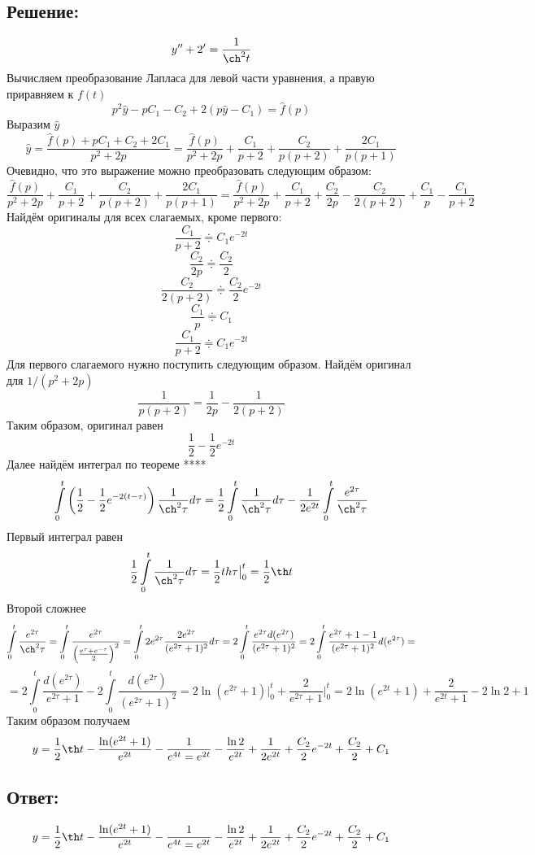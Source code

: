 \documentclass{article}
\begin{document}
	\subsection{Решение:}
	\[y'' + 2' = \frac{1}{\ch^2t}\]
	Вычисляем преобразование Лапласа для левой части уравнения, а правую приравняем к $f(t)$
	\[p^2\hat{y}-pC_1-C_2 + 2(p\hat{y} - C_1) = \hat{f}(p)\]
	Выразим $\hat{y}$
	\[\hat{y} = \frac{\hat{f}(p) + pC_1+C_2+2C_1}{p^2+2p} = \frac{\hat{f}(p)}{p^2+2p} +\frac{C_1}{p+2}+\frac{C_2}{p(p+2)}+\frac{2C_1}{p(p+1)}\]
	Очевидно, что это выражение можно преобразовать следующим образом:
	\[\frac{\hat{f}(p)}{p^2+2p} +\frac{C_1}{p+2}+\frac{C_2}{p(p+2)}+\frac{2C_1}{p(p+1)} = \frac{\hat{f}(p)}{p^2+2p} +\frac{C_1}{p+2}+\frac{C_2}{2p}-\frac{C_2}{2(p+2)}+\frac{C_1}{p} - \frac{C_1}{p+2}\]
	Найдём оригиналы для всех слагаемых, кроме первого:
	\[\frac{C_1}{p+2} \doteqdot  C_1e^{-2t}\]
	\[\frac{C_2}{2p}\doteqdot\frac{C_2}{2}\]
	\[\frac{C_2}{2(p+2)} \doteqdot \frac{C_2}{2}e^{-2t}\]
	\[\frac{C_1}{p} \doteqdot C_1\]
	\[\frac{C_1}{p+2} \doteqdot C_1e^{-2t}\]
	Для первого слагаемого нужно поступить следующим образом.\newline
	Найдём оригинал для $1/(p^2+2p)$
	\[\frac{1}{p(p+2)} = \frac{1}{2p} - \frac{1}{2(p+2)}\]
	Таким образом, оригинал равен
	\[\frac{1}{2} - \frac{1}{2}e^{-2t}\]
	Далее найдём интеграл по теореме ****
	\[\int\limits_{0}^t \left(\frac{1}{2} -\frac{1}{2}e^{-2(t-\tau)}\right)\frac{1}{\ch^2\tau}d\tau=\frac{1}{2}\int\limits_{0}^t \frac{1}{\ch^2\tau}d\tau - \frac{1}{2e^{2t}}\int\limits_{0}^t \frac{e^{2\tau}}{\ch^2\tau}\]
	Первый интеграл равен
	\[\frac{1}{2}\int\limits_{0}^t \frac{1}{\ch^2\tau}d\tau = \frac{1}{2}th\tau\big|_0^t = \frac{1}{2}\th t\]
	Второй сложнее
	\[\int\limits_{0}^t \frac{e^{2\tau}}{\ch^2\tau} = \int\limits_{0}^t \frac{e^{2\tau}}{\left(\frac{e^\tau + e^{-\tau}}{2}\right)^2}=\int\limits_{0}^t 2e^{2\tau} \frac{2e^{2\tau}}{(e^{2\tau}+1)^2}d\tau = 2\int\limits_{0}^t\frac{e^{2\tau}d(e^{2\tau})}{(e^{2\tau} + 1)^2} = 2\int\limits_{0}^t\frac{e^{2\tau}+1-1}{(e^{2\tau} + 1)^2}d(e^{2\tau}) =\]
	\[=2\int\limits_{0}^t\frac{d(e^{2\tau})}{e^{2\tau} + 1} - 2 \int\limits_{0}^t\frac{d(e^{2\tau})}{(e^{2\tau} + 1)^2} = 2 \ln {(e^{2\tau} + 1)} \big|_0^t + \frac{2}{e^{2\tau} +1} \big|_0^t =  2\ln(e^{2t} + 1) + \frac{2}{e^{2t} +1} - 2\ln2 +1 \]
	Таким образом получаем 
	\[y = \frac{1}{2}\th t -\frac{\ln(e^{2t} + 1)}{e^{2t}} - \frac{1}{e^{4t} = e^{2t}} - \frac{\ln2}{e^{2t}} + \frac{1}{2e^{2t}} + \frac{C_2}{2}e^{-2t} + \frac{C_2}{2} + C_1\]
	\subsection{Ответ:}
	\[y = \frac{1}{2}\th t -\frac{\ln(e^{2t} + 1)}{e^{2t}} - \frac{1}{e^{4t} = e^{2t}} - \frac{\ln2}{e^{2t}} + \frac{1}{2e^{2t}} + \frac{C_2}{2}e^{-2t} + \frac{C_2}{2} + C_1\]
	
\end{document}
